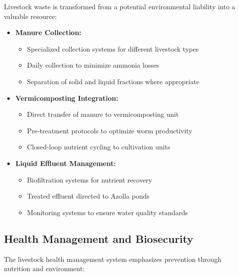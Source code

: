 Livestock waste is transformed from a potential environmental liability into a valuable resource:

\begin{itemize}
    \item \textbf{Manure Collection:}
    \begin{itemize}
        \item Specialized collection systems for different livestock types
        \item Daily collection to minimize ammonia losses
        \item Separation of solid and liquid fractions where appropriate
    \end{itemize}
    
    \item \textbf{Vermicomposting Integration:}
    \begin{itemize}
        \item Direct transfer of manure to vermicomposting unit
        \item Pre-treatment protocols to optimize worm productivity
        \item Closed-loop nutrient cycling to cultivation units
    \end{itemize}
    
    \item \textbf{Liquid Effluent Management:}
    \begin{itemize}
        \item Biofiltration systems for nutrient recovery
        \item Treated effluent directed to Azolla ponds
        \item Monitoring systems to ensure water quality standards
    \end{itemize}
\end{itemize}

\subsection{Health Management and Biosecurity}

The livestock health management system emphasizes prevention through nutrition and environment:

